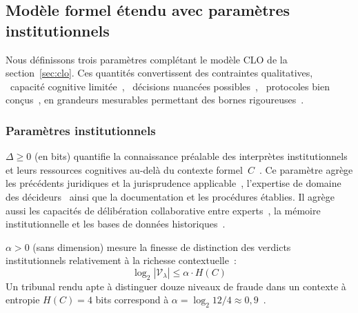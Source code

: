\subsection{Mod\`ele formel \'etendu avec param\`etres institutionnels}
\label{subsec:modele_formel_etendu}
\begin{sloppypar}
Nous d\'efinissons trois param\`etres compl\'etant le mod\`ele CLO de la section~\ref{sec:clo}. Ces quantit\'es convertissent des contraintes
qualitatives, \guillemotleft~capacit\'e cognitive limit\'ee~\guillemotright, \guillemotleft~d\'ecisions nuanc\'ees possibles~\guillemotright,
\guillemotleft~protocoles bien con\c{c}us~\guillemotright, en grandeurs mesurables permettant des bornes
rigoureuses~\cite{ClarksonSchneider10,Smith09}.

\subsubsection{Param\`etres institutionnels}
\label{subsubsec:parametres_institutionnels}

\begin{definition}\label{def:delta_extraction}

$\Delta \geq 0$ (en bits) quantifie la connaissance pr\'ealable des interpr\`etes
institutionnels et leurs ressources cognitives au-del\`a du contexte formel~$C$~\cite{Simon82,Miller56}.
Ce param\`etre agr\`ege les pr\'ec\'edents juridiques et la jurisprudence applicable~\cite{Mason07,Kerr04},
l'expertise de domaine des d\'ecideurs~\cite{Ericsson95,Chi2006} ainsi que la documentation et les proc\'edures
\'etablies. Il agr\`ege aussi les capacit\'es de d\'elib\'eration collaborative entre experts~\cite{Sunstein2005,Hong2016},
la m\'emoire institutionnelle et les bases de donn\'ees historiques~\cite{Argyris1978,Walsh1995}.

\end{definition}

\begin{definition}\label{def:alpha_granularite}

$\alpha > 0$ (sans dimension) mesure la finesse de distinction des verdicts
institutionnels relativement \`a la richesse contextuelle~:
\begin{equation}
\log_2 |\mathcal{V}_\lambda| \leq \alpha \cdot H(C)
\label{eq:alpha_definition}
\end{equation}
Un tribunal rendu apte \`a distinguer douze niveaux de fraude dans un contexte \`a
entropie $H(C) = 4$ bits correspond \`a $\alpha = \log_2 12/4 \approx 0{,}9$~\cite{Shannon48,CoverThomas06}.


\end{definition}
\end{sloppypar}
